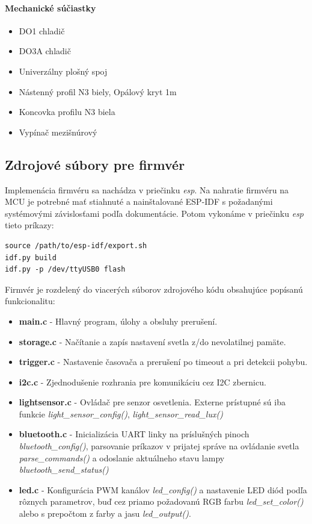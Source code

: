 \documentclass[12pt, a4paper]{article}
\begin{document}
\paragraph{Mechanické súčiastky}
\begin{itemize}
\itemsep0pt
\item DO1 chladič
\item DO3A chladič
\item Univerzálny plošný spoj
\item Nástenný profil N3 biely, Opálový kryt 1m
\item Koncovka profilu N3 biela
\item Vypínač mezišnúrový
\end{itemize}

\subsection{Zdrojové súbory pre firmvér}
Implemenácia firmvéru sa nachádza v priečinku \emph{esp}. Na nahratie firmvéru na MCU je potrebné mať stiahnuté a nainštalované ESP-IDF s požadanými systémovými závislosťami podľa dokumentácie. Potom vykonáme v priečinku \emph{esp} tieto príkazy:
\begin{verbatim}
source /path/to/esp-idf/export.sh
idf.py build
idf.py -p /dev/ttyUSB0 flash
\end{verbatim}

Firmvér je rozdelený do viacerých súborov zdrojového kódu obsahujúce popísanú funkcionalitu:
\begin{itemize}
\itemsep0pt
\item \textbf{main.c} - Hlavný program, úlohy a obsluhy prerušení.
\item \textbf{storage.c} - Načítanie a zapís nastavení svetla z/do nevolatilnej pamäte.
\item \textbf{trigger.c} - Nastavenie časovača a prerušení po timeout a pri detekcii pohybu.
\item \textbf{i2c.c} - Zjednodušenie rozhrania pre komunikáciu cez I2C zbernicu.
\item \textbf{lightsensor.c} - Ovládač pre senzor osvetlenia. Externe prístupné sú iba funkcie \emph{light\_sensor\_config()}, \emph{light\_sensor\_read\_lux()}
\item \textbf{bluetooth.c} - Inicializácia UART linky na príslušných pinoch \emph{bluetooth\_config()}, parsovanie príkazov v prijatej správe na ovládanie svetla \emph{parse\_commands()} a odoslanie aktuálneho stavu lampy \emph{bluetooth\_send\_status()}
\item \textbf{led.c} - Konfigurácia PWM kanálov \emph{led\_config()} a nastavenie LED diód podľa rôznych parametrov, buď cez priamo požadovanú RGB farbu \emph{led\_set\_color()} alebo s prepočtom z farby a jasu  \emph{led\_output()}.
\end{itemize}
\end{document}
